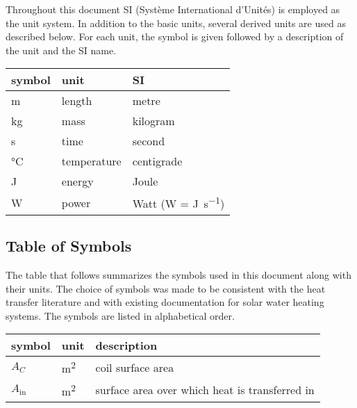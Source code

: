 \documentclass[12pt]{article}
\begin{document}
Throughout this document SI (Syst\`{e}me International d'Unit\'{e}s) is employed as the unit
system. In addition to the basic units, several derived units are used as described below. For each
unit, the symbol is given followed by a description of the unit and the SI name. ~\newline

\renewcommand{\arraystretch}{1.2}
\noindent \begin{tabular}{l l l}
  \toprule
  \textbf{symbol} & \textbf{unit} & \textbf{SI}                       \\
  \midrule
  \si{\metre}     & length        & metre                             \\
  \si{\kilogram}  & mass          & kilogram                          \\
  \si{\second}    & time          & second                            \\
  \si{\celsius}   & temperature   & centigrade                        \\
  \si{\joule}     & energy        & Joule                             \\
  \si{\watt}      & power         & Watt (W = \si{\joule\per\second}) \\
  \bottomrule
\end{tabular}


\subsection{Table of Symbols}

The table that follows summarizes the symbols used in this document along with their units. The
choice of symbols was made to be consistent with the heat transfer literature and with existing
documentation for solar water heating systems. The symbols are listed in alphabetical order.

\renewcommand{\arraystretch}{1.2}
\noindent \begin{longtable*}{l l p{12cm}} \toprule
  \textbf{symbol} & \textbf{unit} & \textbf{description}\\
  \midrule
  $A_C$ & \si[per-mode=symbol] {\square\metre} & coil surface area
  \\
  $A_\text{in}$ & \si[per-mode=symbol] {\square\metre} & surface area over
  which heat is transferred in
  \\
  \bottomrule
\end{longtable*}
\end{document}
